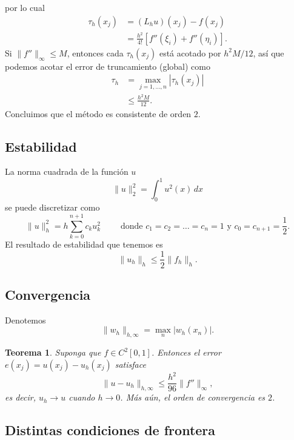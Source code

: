 \documentclass[11pt,letterpaper]{report}
\newtheorem{theorem}{Teorema}
\begin{document}
por lo cual
\begin{align}
  \tau_{h}(x_j)
  &= (L_hu)(x_j) - f(x_j) \\
  &=
    \frac{h^{2}}{4!} [ f''(\xi_i) + f''(\eta_i) ]
.\end{align}
Si $\|f''\|_{\infty}\leq M$, entonces cada $\tau_h(x_j)$ está
acotado por $h^{2}M/12$, así que podemos acotar el error de
truncamiento (global) como
\begin{align}
  \tau_{h}
  &= \max_{j=1,\dots,n} |\tau_{h}(x_j)| \\
  &\leq \frac{h^{2}M}{12}
.\end{align}
Concluimos que el método es consistente de orden $2$.

\subsection{Estabilidad}

La norma cuadrada de la función $u$
\begin{equation}
  \|u\|^{2}_2 = \int_{0}^{1}u^{2}(x)\,dx
\end{equation}
se puede discretizar como
\begin{equation}
  \|u\|^{2}_h = h\sum_{k=0}^{n+1}c_ku_k^{2}
  \qquad \text{ donde }
  c_1=c_2=\dots=c_n=1 
  \text{ y }
  c_0=c_{n+1}=\frac{1}{2}.
\end{equation}
El resultado de estabilidad que tenemos es
\begin{equation}
  \|u_h\|_h \leq \frac{1}{2} \|f_h\|_h
.\end{equation}

\subsection{Convergencia}

Denotemos
\begin{equation}
  \|w_h\|_{h,\infty} = \max_{n}|w_h(x_n)|
.\end{equation}

\begin{theorem}
  Suponga que $f\in C^{2}[0,1]$. Entonces el error
  $e(x_j)=u(x_j)-u_h(x_j)$ satisface
  \begin{equation}
    \|u-u_h\|_{h,\infty} \leq \frac{h^{2}}{96}\|f''\|_{\infty}
  ,\end{equation}
  es decir, $u_h\to u$ cuando $h\to 0$. Más aún, el orden de
  convergencia es $2$.
\end{theorem}

\subsection{Distintas condiciones de frontera}
\end{document}
